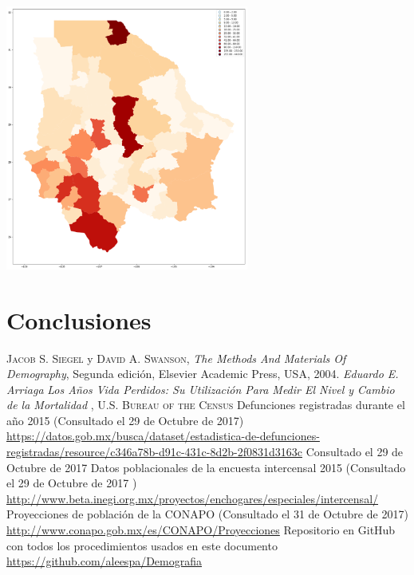 \documentclass[fontsize=11pt]{article}
\begin{document}
\includegraphics[width=0.6\textwidth]{map}
\section*{Conclusiones}
\begin{thebibliography}{X}
 \textsc{Jacob S. Siegel} y \textsc{David A. Swanson}, \textit{The Methods And
Materials Of Demography}, Segunda edición,
Elsevier Academic Press, USA, 2004.
 \textit{Eduardo E. Arriaga}\textit{ Los Años Vida Perdidos: Su Utilización Para Medir El Nivel y Cambio de la Mortalidad} , \textsc{U.S. Bureau of the Census} 
 Defunciones registradas durante el año 2015 (Consultado el 29 de Octubre de 2017)  \url{https://datos.gob.mx/busca/dataset/estadistica-de-defunciones-registradas/resource/c346a78b-d91c-431c-8d2b-2f0831d3163c} Consultado el 29 de Octubre de 2017 
 Datos poblacionales de la encuesta intercensal 2015 (Consultado el 29 de Octubre de 2017 ) \url{http://www.beta.inegi.org.mx/proyectos/enchogares/especiales/intercensal/} 
 Proyecciones de población de la CONAPO (Consultado el 31 de Octubre de 2017) \url{http://www.conapo.gob.mx/es/CONAPO/Proyecciones} 
 Repositorio en GitHub con todos los procedimientos usados en este documento \url{https://github.com/aleespa/Demografia}
\end{thebibliography}
\end{document}
